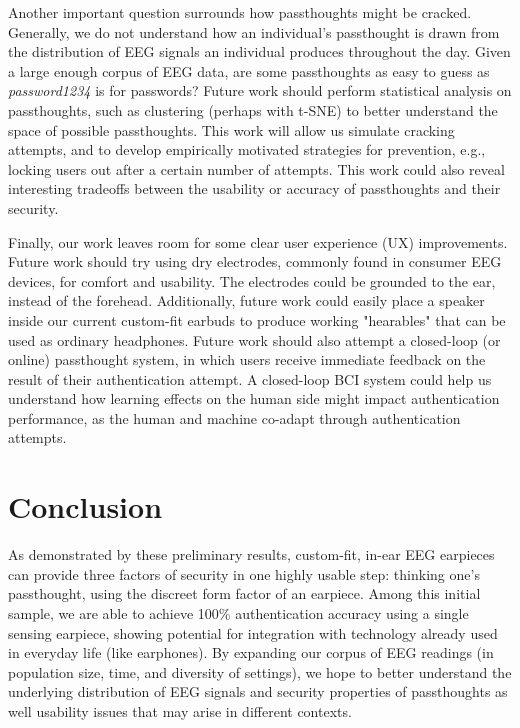 \documentclass{sigchi}
\begin{document}
Another important question surrounds how passthoughts might be cracked. Generally, we do not understand how an individual's passthought is drawn from the distribution of EEG signals an individual produces throughout the day. Given a large enough corpus of EEG data, are some passthoughts as easy to guess as \textit{password1234} is for passwords? Future work should perform statistical analysis on passthoughts, such as clustering (perhaps with t-SNE) to better understand the space of possible passthoughts. This work will allow us simulate cracking attempts, and to develop empirically motivated strategies for prevention, e.g., locking users out after a certain number of attempts. This work could also reveal interesting tradeoffs between the usability or accuracy of passthoughts and their security.

Finally, our work leaves room for some clear user experience (UX) improvements. Future work should try using dry electrodes, commonly found in consumer EEG devices, for comfort and usability. The electrodes could be grounded to the ear, instead of the forehead. Additionally, future work could easily place a speaker inside our current custom-fit earbuds to produce working "hearables" that can be used as ordinary headphones. Future work should also attempt a closed-loop (or online) passthought system, in which users receive immediate feedback on the result of their authentication attempt. A closed-loop BCI system could help us understand how learning effects on the human side might impact authentication performance, as the human and machine co-adapt through authentication attempts.

\section{Conclusion}

As demonstrated by these preliminary results, custom-fit, in-ear EEG earpieces can provide three factors of security in one highly usable step: thinking one's passthought, using the discreet form factor of an earpiece. Among this initial sample, we are able to achieve 100\% authentication accuracy using a single sensing earpiece, showing potential for integration with technology already used in everyday life (like earphones). By expanding our corpus of EEG readings (in population size, time, and diversity of settings), we hope to better understand the underlying distribution of EEG signals and security properties of passthoughts as well usability issues that may arise in different contexts.
\end{document}

